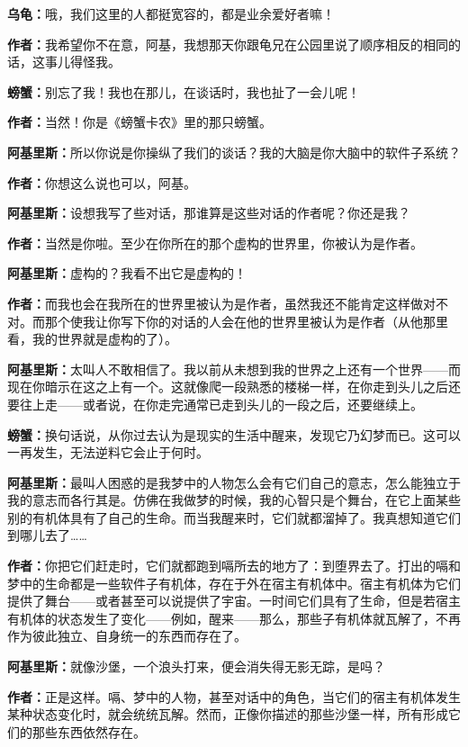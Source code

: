 \documentclass[
  12pt,
  twoside,
  openright,
  oldfontcommands,
]{memoir}
\newcommand{\dialogname}[1]{{\sffamily\bfseries #1}}
\begin{document}
\dialogname{乌龟：}哦，我们这里的人都挺宽容的，都是业余爱好者嘛！

\dialogname{作者：}我希望你不在意，阿基，我想那天你跟龟兄在公园里说了顺序相反的相同的话，这事儿得怪我。

\dialogname{螃蟹：}别忘了我！我也在那儿，在谈话时，我也扯了一会儿呢！

\dialogname{作者：}当然！你是《螃蟹卡农》里的那只螃蟹。

\dialogname{阿基里斯：}所以你说是你操纵了我们的谈话？我的大脑是你大脑中的软件子系统？

\dialogname{作者：}你想这么说也可以，阿基。

\dialogname{阿基里斯：}设想我写了些对话，那谁算是这些对话的作者呢？你还是我？

\dialogname{作者：}当然是你啦。至少在你所在的那个虚构的世界里，你被认为是作者。

\dialogname{阿基里斯：}虚构的？我看不出它是虚构的！

\dialogname{作者：}而我也会在我所在的世界里被认为是作者，虽然我还不能肯定这样做对不对。而那个使我让你写下你的对话的人会在他的世界里被认为是作者（从他那里看，我的世界就是虚构的了）。

\dialogname{阿基里斯：}太叫人不敢相信了。我以前从未想到我的世界之上还有一个世界------而现在你暗示在这之上有一个。这就像爬一段熟悉的楼梯一样，在你走到头儿之后还要往上走------或者说，在你走完通常已走到头儿的一段之后，还要继续上。

\dialogname{螃蟹：}换句话说，从你过去认为是现实的生活中醒来，发现它乃幻梦而已。这可以一再发生，无法逆料它会止于何时。

\dialogname{阿基里斯：}最叫人困惑的是我梦中的人物怎么会有它们自己的意志，怎么能独立于我的意志而各行其是。仿佛在我做梦的时候，我的心智只是个舞台，在它上面某些别的有机体具有了自己的生命。而当我醒来时，它们就都溜掉了。我真想知道它们到哪儿去了\ldots\ldots{}

\dialogname{作者：}你把它们赶走时，它们就都跑到嗝所去的地方了：到堕界去了。打出的嗝和梦中的生命都是一些软件子有机体，存在于外在宿主有机体中。宿主有机体为它们提供了舞台------或者甚至可以说提供了宇宙。一时间它们具有了生命，但是若宿主有机体的状态发生了变化------例如，醒来------那么，那些子有机体就瓦解了，不再作为彼此独立、自身统一的东西而存在了。

\dialogname{阿基里斯：}就像沙堡，一个浪头打来，便会消失得无影无踪，是吗？

\dialogname{作者：}正是这样。嗝、梦中的人物，甚至对话中的角色，当它们的宿主有机体发生某种状态变化时，就会统统瓦解。然而，正像你描述的那些沙堡一样，所有形成它们的那些东西依然存在。
\end{document}
